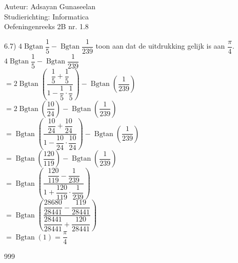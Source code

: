 \documentclass[a4paper]{article}
\newcommand{\bgtan}{\operatorname{Bgtan}}
\begin{document}
\noindent \large Auteur: Adsayan Gunaseelan \\
\noindent \large Studierichting: Informatica\\
\noindent \large Oefeningenreeks 2B nr. 1.8\\

\medskip

\normalsize
6.7) $ 4\bgtan \dfrac{1}{5}-\bgtan \dfrac{1}{239}$ toon aan dat de uitdrukking gelijk is aan $\dfrac{\pi}{4}.$\\

$ 4\bgtan \dfrac{1}{5}-\bgtan \dfrac{1}{239}$\\

$= 2\bgtan \left(\dfrac{\dfrac{1}{5}+\dfrac{1}{5}}{1-\dfrac{1}{5}\cdot \dfrac{1}{5}}\right)- \bgtan \left(\dfrac{1}{239}\right)$\\

$= 2\bgtan \left(\dfrac{10}{24}\right)- \bgtan \left(\dfrac{1}{239}\right)$\\

$= \bgtan \left(\dfrac{\dfrac{10}{24}+\dfrac{10}{24}}{1-\dfrac{10}{24}\cdot \dfrac{10}{24}}\right)- \bgtan \left(\dfrac{1}{239}\right)$\\

$= \bgtan \left(\dfrac{120}{119}\right)- \bgtan \left(\dfrac{1}{239}\right)$\\

$= \bgtan \left(\dfrac{\dfrac{120}{119}-\dfrac{1}{239}}{1+\dfrac{120}{119}\cdot \dfrac{1}{239}}\right)$\\

$= \bgtan \left(\dfrac{\dfrac{28680}{28441}-\dfrac{119}{28441}}{\dfrac{28441}{28441} +\dfrac{120}{28441}}\right)$\\

$= \bgtan \left(1\right) = \dfrac{\pi}{4}$\\


\begin{thebibliography}{999}
\end{thebibliography}
\end{document}
